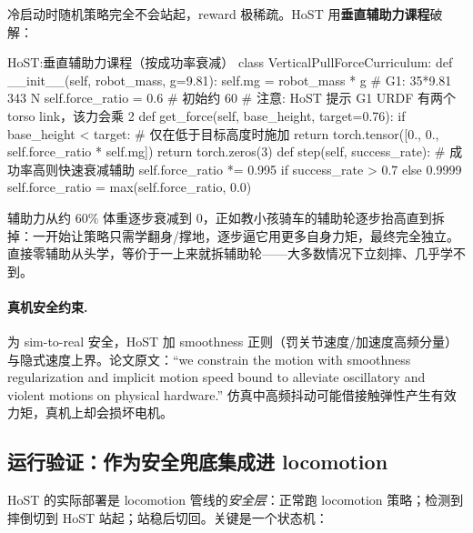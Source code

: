 冷启动时随机策略完全不会站起，reward 极稀疏。HoST 用\textbf{垂直辅助力课程}破解：

\begin{codebox}[Python]{HoST:垂直辅助力课程（按成功率衰减）}
class VerticalPullForceCurriculum:
    def __init__(self, robot_mass, g=9.81):
        self.mg = robot_mass * g           # G1: 35*9.81 ~ 343 N
        self.force_ratio = 0.6             # 初始约 60%
        # 注意: HoST 提示 G1 URDF 有两个 torso link，该力会乘 2
    def get_force(self, base_height, target=0.76):
        if base_height < target:           # 仅在低于目标高度时施加
            return torch.tensor([0., 0., self.force_ratio * self.mg])
        return torch.zeros(3)
    def step(self, success_rate):          # 成功率高则快速衰减辅助
        self.force_ratio *= 0.995 if success_rate > 0.7 else 0.9999
        self.force_ratio = max(self.force_ratio, 0.0)
\end{codebox}

\begin{insight}[辅助力课程像自行车辅助轮]\label{ins:rlmc-hl-aux}
辅助力从约 $60\%$ 体重逐步衰减到 $0$，正如教小孩骑车的辅助轮逐步抬高直到拆掉：一开始让策略只需学翻身/撑地，逐步逼它用更多自身力矩，最终完全独立。直接零辅助从头学，等价于一上来就拆辅助轮——大多数情况下立刻摔、几乎学不到。
\end{insight}

\paragraph{真机安全约束.}
为 sim-to-real 安全，HoST 加 smoothness 正则（罚关节速度/加速度高频分量）与隐式速度上界。论文原文：“we constrain the motion with smoothness regularization and implicit motion speed bound to alleviate oscillatory and violent motions on physical hardware.” 仿真中高频抖动可能借接触弹性产生有效力矩，真机上却会损坏电机。

\subsection{运行验证：作为安全兜底集成进 locomotion}
HoST 的实际部署是 locomotion 管线的\emph{安全层}：正常跑 locomotion 策略；检测到摔倒切到 HoST 站起；站稳后切回。关键是一个状态机：


